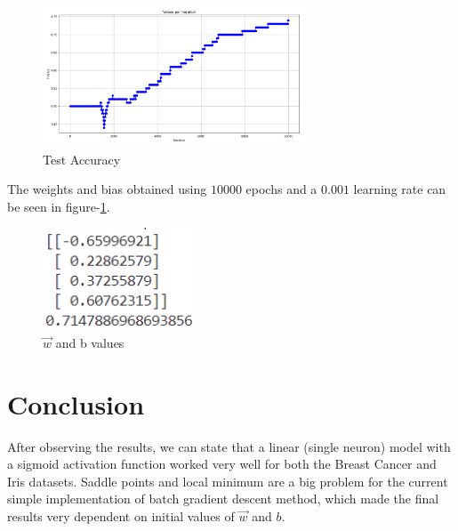 \documentclass{article}
\begin{document}
            \begin{figure}[H]
                \centering
                \includegraphics[width=0.7\textwidth]{iris-test-acc.png}
                \caption{Test Accuracy}
            \end{figure}
            The weights and bias obtained using $10000$ epochs and a $0.001$ learning rate can be seen in figure-\ref{fig:iris-results}.
            \begin{figure}[H]
                \centering
                \includegraphics[width=0.4\textwidth]{iris-results.png}
                \caption{$\vec{w}$ and b values}
                \label{fig:iris-results}
            \end{figure}
    \section*{Conclusion}
        After observing the results, we can state that a linear (single neuron) model with a sigmoid activation function worked very well for both the Breast Cancer and Iris datasets. Saddle points and local minimum are a big problem for the current simple implementation of batch gradient descent method, which made the final results very dependent on initial values of $\vec{w}$ and $b$.
    
\end{document}
